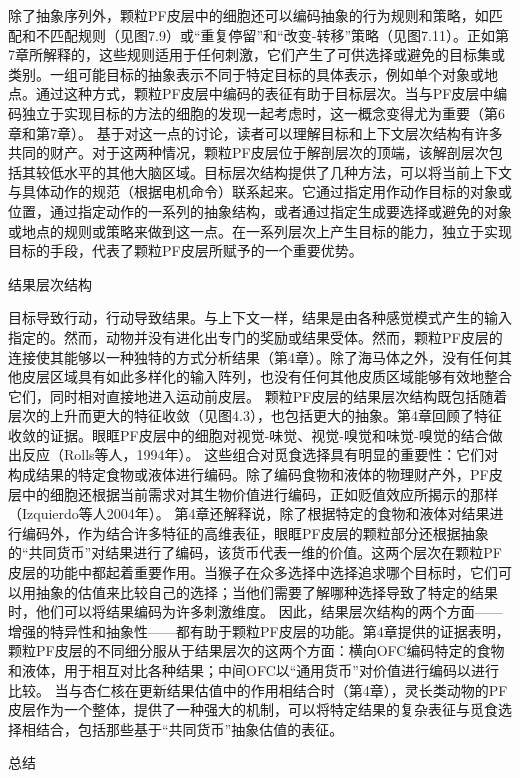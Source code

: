 除了抽象序列外，颗粒PF皮层中的细胞还可以编码抽象的行为规则和策略，如匹配和不匹配规则（见图7.9）或“重复停留”和“改变-转移”策略（见图7.11）。正如第7章所解释的，这些规则适用于任何刺激，它们产生了可供选择或避免的目标集或类别。一组可能目标的抽象表示不同于特定目标的具体表示，例如单个对象或地点。通过这种方式，颗粒PF皮层中编码的表征有助于目标层次。当与PF皮层中编码独立于实现目标的方法的细胞的发现一起考虑时，这一概念变得尤为重要（第6章和第7章）。
基于对这一点的讨论，读者可以理解目标和上下文层次结构有许多共同的财产。对于这两种情况，颗粒PF皮层位于解剖层次的顶端，该解剖层次包括其较低水平的其他大脑区域。目标层次结构提供了几种方法，可以将当前上下文与具体动作的规范（根据电机命令）联系起来。它通过指定用作动作目标的对象或位置，通过指定动作的一系列的抽象结构，或者通过指定生成要选择或避免的对象或地点的规则或策略来做到这一点。在一系列层次上产生目标的能力，独立于实现目标的手段，代表了颗粒PF皮层所赋予的一个重要优势。


结果层次结构

目标导致行动，行动导致结果。与上下文一样，结果是由各种感觉模式产生的输入指定的。然而，动物并没有进化出专门的奖励或结果受体。然而，颗粒PF皮层的连接使其能够以一种独特的方式分析结果（第4章）。除了海马体之外，没有任何其他皮层区域具有如此多样化的输入阵列，也没有任何其他皮质区域能够有效地整合它们，同时相对直接地进入运动前皮层。
颗粒PF皮层的结果层次结构既包括随着层次的上升而更大的特征收敛（见图4.3），也包括更大的抽象。第4章回顾了特征收敛的证据。眼眶PF皮层中的细胞对视觉-味觉、视觉-嗅觉和味觉-嗅觉的结合做出反应（Rolls等人，1994年）。
这些组合对觅食选择具有明显的重要性：它们对构成结果的特定食物或液体进行编码。除了编码食物和液体的物理财产外，PF皮层中的细胞还根据当前需求对其生物价值进行编码，正如贬值效应所揭示的那样（Izquierdo等人2004年）。
第4章还解释说，除了根据特定的食物和液体对结果进行编码外，作为结合许多特征的高维表征，眼眶PF皮层的颗粒部分还根据抽象的“共同货币”对结果进行了编码，该货币代表一维的价值。这两个层次在颗粒PF皮层的功能中都起着重要作用。当猴子在众多选择中选择追求哪个目标时，它们可以用抽象的估值来比较自己的选择；当他们需要了解哪种选择导致了特定的结果时，他们可以将结果编码为许多刺激维度。
因此，结果层次结构的两个方面——增强的特异性和抽象性——都有助于颗粒PF皮层的功能。第4章提供的证据表明，颗粒PF皮层的不同细分服从于结果层次的这两个方面：横向OFC编码特定的食物和液体，用于相互对比各种结果；中间OFC以“通用货币”对价值进行编码以进行比较。
当与杏仁核在更新结果估值中的作用相结合时（第4章），灵长类动物的PF皮层作为一个整体，提供了一种强大的机制，可以将特定结果的复杂表征与觅食选择相结合，包括那些基于“共同货币”抽象估值的表征。

总结

